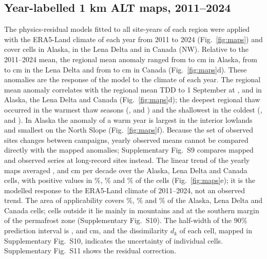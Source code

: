 \subsection{Year-labelled 1 km ALT maps, 2011--2024}
The physics-residual models fitted to all site-years of each region were applied with the ERA5-Land climate of each year from 2011 to 2024 (Fig.~\ref{fig:maps}) and cover \nncellmapAk{} cells in Alaska, \nncellmapLe{} in the Lena Delta and \nncellmapCa{} in Canada (NW). Relative to the 2011--2024 mean, the regional mean anomaly ranged from \nanminAk{} to \nanmaxAk{} cm in Alaska, from \nanminLe{} to \nanmaxLe{} cm in the Lena Delta and from \nanminCa{} to \nanmaxCa{} cm in Canada (Fig.~\ref{fig:maps}d). These anomalies are the response of the model to the climate of each year. The regional mean anomaly correlates with the regional mean TDD to 1 September at \ntddanomAk{}, \ntddanomLe{} and \ntddanomCa{} in Alaska, the Lena Delta and Canada (Fig.~\ref{fig:maps}d); the deepest regional thaw occurred in the warmest thaw seasons (\ntddmaxAk{}, \ntddmaxLe{} and \ntddmaxCa) and the shallowest in the coldest (\ntddminAk, \ntddminLe{} and \ntddminCa). In Alaska the anomaly of a warm year is largest in the interior lowlands and smallest on the North Slope (Fig.~\ref{fig:maps}f). Because the set of observed sites changes between campaigns, yearly observed means cannot be compared directly with the mapped anomalies; Supplementary Fig.~S9 compares mapped and observed series at long-record sites instead. The linear trend of the yearly maps averaged \ntrendAk{}, \ntrendLe{} and \ntrendCa{} cm per decade over the Alaska, Lena Delta and Canada cells, with positive values in \ntrendposAk\%, \ntrendposLe\% and \ntrendposCa\% of the cells (Fig.~\ref{fig:maps}e); it is the modelled response to the ERA5-Land climate of 2011--2024, not an observed trend. The area of applicability covers \naoaAk\%, \naoaLe\% and \naoaCa\% of the Alaska, Lena Delta and Canada cells; cells outside it lie mainly in mountains and at the southern margin of the permafrost zone (Supplementary Fig.~S10). The half-width of the 90\% prediction interval is \nhwAk{}, \nhwLe{} and \nhwCa{} cm, and the dissimilarity $d_k$ of each cell, mapped in Supplementary Fig.~S10, indicates the uncertainty of individual cells. Supplementary Fig.~S11 shows the residual correction.

